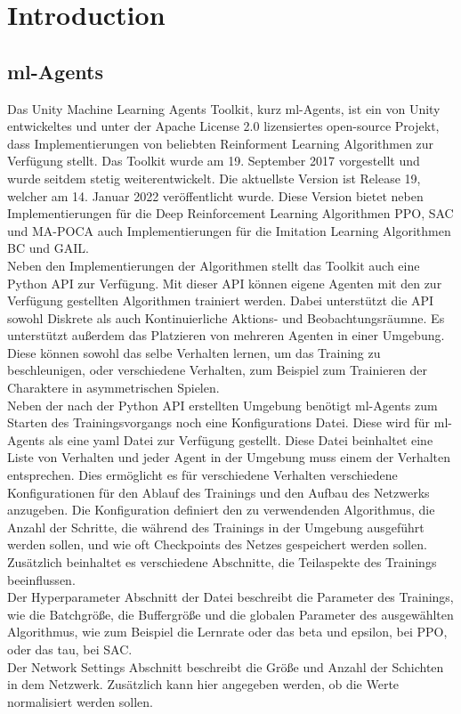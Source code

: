 \section{Introduction}
\subsection{ml-Agents} \label{mlAgentsFramework}
Das Unity Machine Learning Agents Toolkit, kurz ml-Agents, ist ein von Unity entwickeltes und unter der Apache License 2.0 lizensiertes open-source Projekt, dass Implementierungen von beliebten Reinforment Learning Algorithmen zur Verfügung stellt.
Das Toolkit wurde am 19. September 2017 vorgestellt und wurde seitdem stetig weiterentwickelt. Die aktuellste Version ist Release 19, welcher am 14. Januar 2022 veröffentlicht wurde. Diese Version bietet neben Implementierungen für die Deep Reinforcement Learning Algorithmen PPO, SAC und MA-POCA auch Implementierungen für die Imitation Learning Algorithmen BC und GAIL.\\

\noindent Neben den Implementierungen der Algorithmen stellt das Toolkit auch eine Python API zur Verfügung. Mit dieser API können eigene Agenten mit den zur Verfügung gestellten Algorithmen trainiert werden. Dabei unterstützt die API sowohl Diskrete als auch Kontinuierliche Aktions- und Beobachtungsräumne. Es unterstützt außerdem das Platzieren von mehreren Agenten in einer Umgebung. Diese können sowohl das selbe Verhalten lernen, um das Training zu beschleunigen, oder verschiedene Verhalten, zum Beispiel zum Trainieren der Charaktere in asymmetrischen Spielen. \\

\noindent Neben der nach der Python API erstellten Umgebung benötigt ml-Agents zum Starten des Trainingsvorgangs noch eine Konfigurations Datei. Diese wird für ml-Agents als eine yaml Datei zur Verfügung gestellt. Diese Datei beinhaltet eine Liste von Verhalten und jeder Agent in der Umgebung muss einem der Verhalten entsprechen. Dies ermöglicht es für verschiedene Verhalten verschiedene Konfigurationen für den Ablauf des Trainings und den Aufbau des Netzwerks anzugeben. 
Die Konfiguration definiert den zu verwendenden Algorithmus, die Anzahl der Schritte, die während des Trainings in der Umgebung ausgeführt werden sollen, und wie oft Checkpoints des Netzes gespeichert werden sollen. Zusätzlich beinhaltet es verschiedene Abschnitte, die Teilaspekte des Trainings beeinflussen. \\
Der Hyperparameter Abschnitt der Datei beschreibt die Parameter des Trainings, wie die Batchgröße, die Buffergröße und die globalen Parameter des ausgewählten Algorithmus, wie zum Beispiel die Lernrate oder das beta und epsilon, bei PPO, oder das tau, bei SAC. \\
Der Network Settings Abschnitt beschreibt die Größe und Anzahl der Schichten in dem Netzwerk. Zusätzlich kann hier angegeben werden, ob die Werte normalisiert werden sollen.\\

